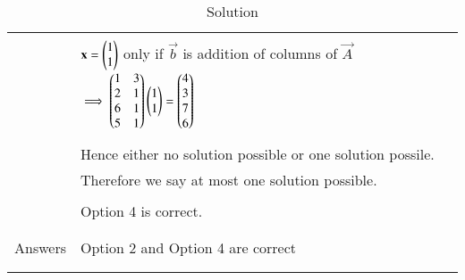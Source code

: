 \begin{longtable}{|l|l|}
&\\
&$\mathbf{x}=\begin{pmatrix}1\\1\end{pmatrix}$ only if $\vec{b}$ is addition of columns of $\vec{A}$ $\implies \begin{pmatrix}1&3\\2&1\\6&1\\5&1\end{pmatrix}\begin{pmatrix}1\\1\end{pmatrix}=\begin{pmatrix}4\\3\\7\\6\end{pmatrix}$\\
&\\
&Hence either no solution possible or one solution possile.\\&Therefore we say at most one solution possible.\\
&\\
&Option 4 is correct.\\
&\\
\hline
&\\
Answers & Option 2 and Option 4 are correct\\
&\\
\hline
\caption{Solution}
\label{eq:solutions/2015/dec/76/table:1}
\end{longtable}
\twocolumn


